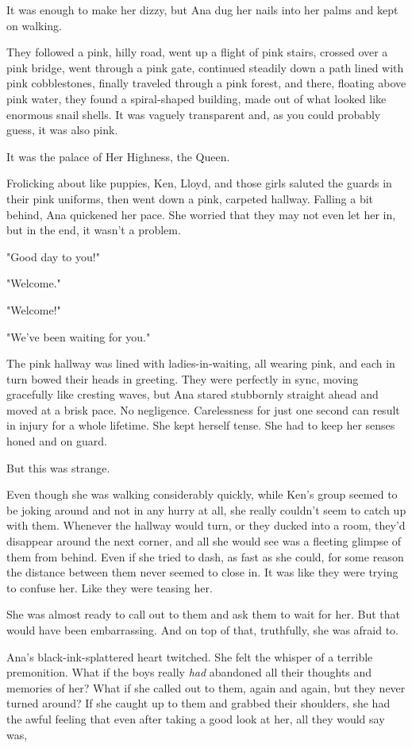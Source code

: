 \documentclass[
]{article}
\begin{document}
It was enough to make her dizzy, but Ana dug her nails into her palms
and kept on walking.

They followed a pink, hilly road, went up a flight of pink stairs,
crossed over a pink bridge, went through a pink gate, continued steadily
down a path lined with pink cobblestones, finally traveled through a
pink forest, and there, floating above pink water, they found a
spiral-shaped building, made out of what looked like enormous snail
shells. It was vaguely transparent and, as you could probably guess, it
was also pink.

It was the palace of Her Highness, the Queen.

Frolicking about like puppies, Ken, Lloyd, and those girls saluted the
guards in their pink uniforms, then went down a pink, carpeted hallway.
Falling a bit behind, Ana quickened her pace. She worried that they may
not even let her in, but in the end, it wasn't a problem.

"Good day to you!"

"Welcome."

"Welcome!"

"We've been waiting for you."

The pink hallway was lined with ladies-in-waiting, all wearing pink, and
each in turn bowed their heads in greeting. They were perfectly in sync,
moving gracefully like cresting waves, but Ana stared stubbornly
straight ahead and moved at a brisk pace. No negligence. Carelessness
for just one second can result in injury for a whole lifetime. She kept
herself tense. She had to keep her senses honed and on guard.

But this was strange.

Even though she was walking considerably quickly, while Ken's group
seemed to be joking around and not in any hurry at all, she really
couldn't seem to catch up with them. Whenever the hallway would turn, or
they ducked into a room, they'd disappear around the next corner, and
all she would see was a fleeting glimpse of them from behind. Even if
she tried to dash, as fast as she could, for some reason the distance
between them never seemed to close in. It was like they were trying to
confuse her. Like they were teasing her.

She was almost ready to call out to them and ask them to wait for her.
But that would have been embarrassing. And on top of that, truthfully,
she was afraid to.

Ana's black-ink-splattered heart twitched. She felt the whisper of a
terrible premonition. What if the boys really \emph{had} abandoned all
their thoughts and memories of her? What if she called out to them,
again and again, but they never turned around? If she caught up to them
and grabbed their shoulders, she had the awful feeling that even after
taking a good look at her, all they would say was,
\end{document}
